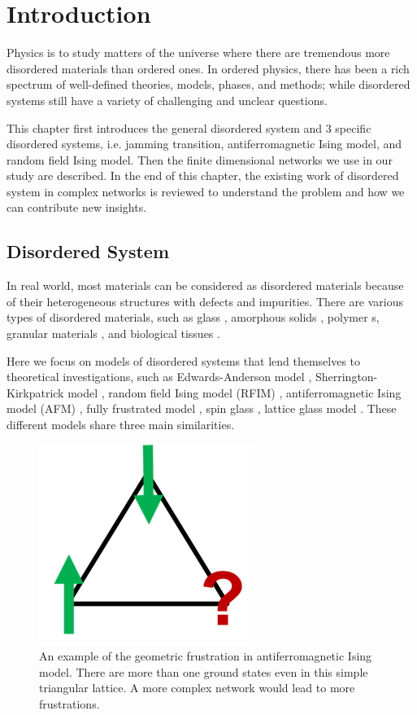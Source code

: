 \chapter{Introduction}
\label{chap-intro}

Physics is to study matters of the universe where 
there are tremendous more disordered materials than ordered ones.
In ordered physics, there has been a rich spectrum of 
well-defined theories, models, phases, and methods; while disordered 
systems still have a variety of challenging and unclear questions. 

This chapter first introduces the general disordered system and 3 specific disordered systems, i.e. jamming transition, antiferromagnetic Ising model, and random field Ising model. Then the finite dimensional networks we use in our study are described. In the end of this chapter, the existing work of disordered system in complex networks is reviewed to understand the problem and how we can contribute new insights.

\section{Disordered System}
In real world, most materials can be considered as disordered materials because of their heterogeneous structures with defects and impurities. There are various types of disordered materials, such as glass \cite{Gibbs1958nature, berthier2016facets}, amorphous solids \cite{berthier2016facets}, polymer s\cite{roth2005glass}, granular materials \cite{richard2005slow}, and biological tissues \cite{bi2015density}. 

Here we focus on models of disordered systems that lend themselves to theoretical investigations, such as Edwards-Anderson model \cite{edwards1975theory}, Sherrington-Kirkpatrick model \cite{sherrington1975}, random field Ising model (RFIM) \cite{imry1975random}, antiferromagnetic Ising model (AFM) \cite{wannier1950afm},  fully frustrated model \cite{kosterlitz1973ordering, kosterlitz1974critical}, spin glass \cite{young1997spin}, lattice glass model \cite{Biroli02}. These different models share  three main similarities. 
\begin{figure}[h]
\centering \includegraphics[width=0.2\columnwidth]{Chapter-1/geo_frustration.png} 
\protect\caption{\label{fig:intro-gf} An example of the geometric frustration in antiferromagnetic Ising model. There are more than one ground states even in this simple triangular lattice. A more complex network would lead to more frustrations.}
\end{figure}


